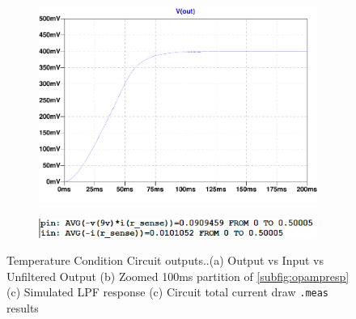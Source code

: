 \begin{figure}[H]
\begin{subfigure}[]{0.45\textwidth}
		\caption{} \label{subfig:opamprespzoom}
    \end{subfigure}
    \begin{subfigure}[]{0.45\textwidth}
        \centering
  		\includegraphics[width=1\linewidth]{./Figures/pdf/LPFResponse2.pdf}
		\caption{} \label{subfig:lpfresp}
    \end{subfigure}
    \begin{subfigure}[]{0.45\textwidth}
        \centering
  		\includegraphics[width=1\linewidth]{./Figures/Pictures/OpAmpMeasResults.png}
		\caption{} \label{subfig:opampcurr}
    \end{subfigure}
    \caption{Temperature Condition Circuit outputs..(a) Output vs Input vs Unfiltered Output  (b) Zoomed 100ms partition of \ref{subfig:opampresp} (c) Simulated LPF response (c) Circuit total current draw \texttt{.meas} results}
    \label{fig:temp_circuit}
\end{figure}

